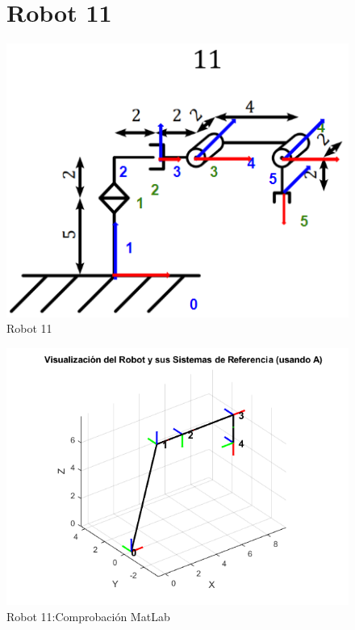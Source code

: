 \begin{figure}[h]
	\section{Robot 11}
	\centering
	{%
	\includegraphics[width=0.5\linewidth]{img/Diagrama11}
	\caption{Robot 11}
	\label{fig:diagrama11}
	}
\end{figure}
\begin{figure}[h]
	\centering
	{%
	\includegraphics[width=0.7\linewidth]{img/MatLab11}
	\caption{Robot 11:Comprobación MatLab}
	\label{fig:matlab11}
	}
\end{figure}
